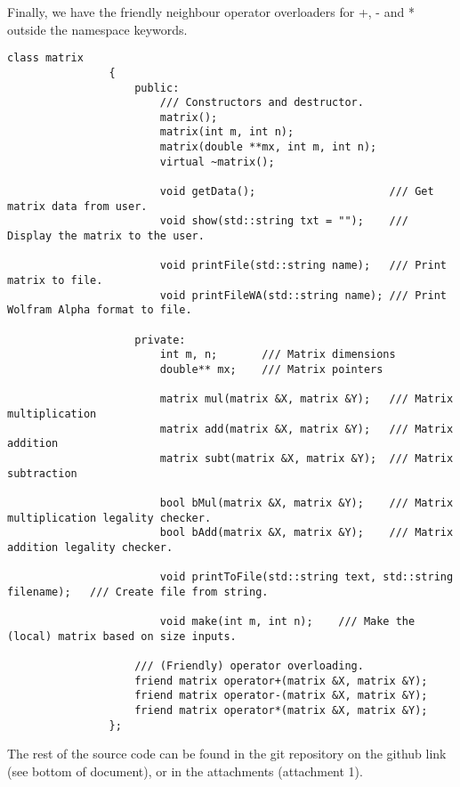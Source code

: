 \documentclass{article}
\begin{document}
			Finally, we have the friendly neighbour operator overloaders for +, - and * outside the namespace keywords.
			\begin{lstlisting}[style=cpp]
				class matrix
				{
					public:
						/// Constructors and destructor.
						matrix();
						matrix(int m, int n);
						matrix(double **mx, int m, int n);
						virtual ~matrix();
						
						void getData();                     /// Get matrix data from user.
						void show(std::string txt = "");    /// Display the matrix to the user.
						
						void printFile(std::string name);   /// Print matrix to file.
						void printFileWA(std::string name); /// Print Wolfram Alpha format to file.
					
					private:
						int m, n;       /// Matrix dimensions
						double** mx;    /// Matrix pointers
						
						matrix mul(matrix &X, matrix &Y);   /// Matrix multiplication
						matrix add(matrix &X, matrix &Y);   /// Matrix addition
						matrix subt(matrix &X, matrix &Y); 	/// Matrix subtraction
						
						bool bMul(matrix &X, matrix &Y);    /// Matrix multiplication legality checker.
						bool bAdd(matrix &X, matrix &Y);  	/// Matrix addition legality checker.
						
						void printToFile(std::string text, std::string filename);   /// Create file from string.
						
						void make(int m, int n);    /// Make the (local) matrix based on size inputs.
					
					/// (Friendly) operator overloading.
					friend matrix operator+(matrix &X, matrix &Y);
					friend matrix operator-(matrix &X, matrix &Y);
					friend matrix operator*(matrix &X, matrix &Y);
				};
			\end{lstlisting}
			The rest of the source code can be found in the git repository on the github link (see bottom of document), or in the attachments (attachment 1).
	
	
\end{document}

